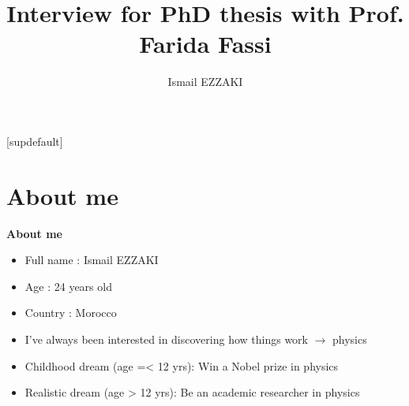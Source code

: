 \documentclass[11pt,aspectratio=169]{beamer}
\title[ \hspace{0.8cm} \insertframenumber/\inserttotalframenumber]{{\sc Interview for PhD thesis with Prof. Farida Fassi}}
\author{{ Ismail EZZAKI}}
\begin{document}
[supdefault]

{
	\begin{frame}
		\begin{center}	%
		\end{center}

		\titlepage
	\end{frame}
}
%





\section{About me}

\begin{frame}{\underline{\secname}}

	\begin{center}
		\textbf{About me}
	\end{center}


	\begin{itemize}
		\item Full name : Ismail EZZAKI
		\item Age : 24 years old
		\item Country : Morocco
		\item I’ve always been interested in discovering how things work $\rightarrow$ physics
		\item Childhood dream (age =< 12 yrs): Win a Nobel prize in physics
		\item Realistic dream (age > 12 yrs): Be an academic researcher in physics
	\end{itemize}


\end{frame}
\end{document}
